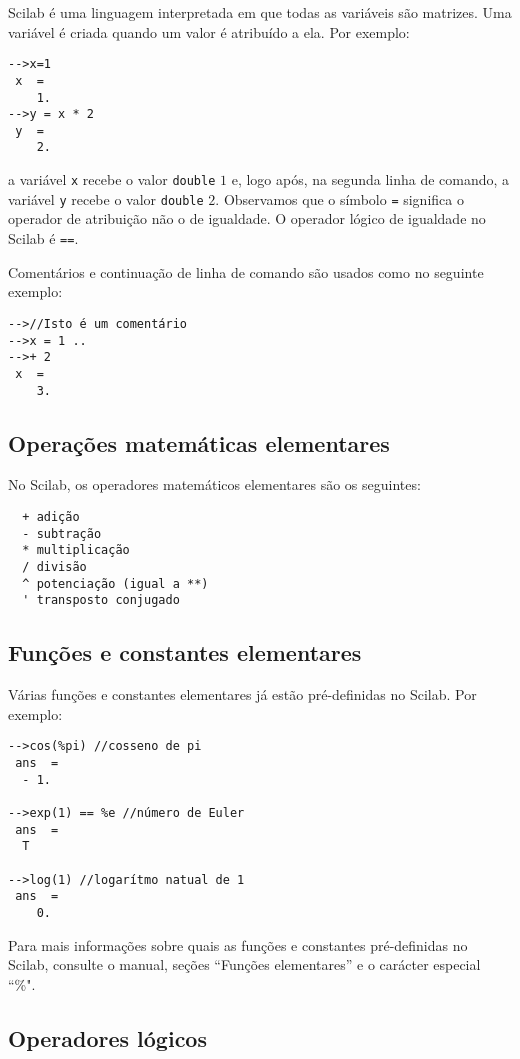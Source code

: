 Scilab é uma linguagem interpretada em que todas as variáveis são matrizes. Uma variável é criada quando um valor é atribuído a ela. Por exemplo:
\begin{verbatim}
-->x=1
 x  =
    1.  
-->y = x * 2
 y  =
    2.  
\end{verbatim}
a variável \verb+x+ recebe o valor \verb+double+ $1$ e, logo após, na segunda linha de comando, a variável \verb+y+ recebe o valor \verb+double+ $2$. Observamos que o símbolo \verb+=+ significa o operador de atribuição não o de igualdade. O operador lógico de igualdade no Scilab é \verb+==+.

Comentários e continuação de linha de comando são usados como no seguinte exemplo:
\begin{verbatim}
-->//Isto é um comentário
-->x = 1 ..
-->+ 2
 x  =
    3.  
\end{verbatim}

\subsection{Operações matemáticas elementares}

No Scilab, os operadores matemáticos elementares são os seguintes:
\begin{verbatim}
  + adição
  - subtração
  * multiplicação
  / divisão
  ^ potenciação (igual a **)
  ' transposto conjugado
\end{verbatim}

\subsection{Funções e constantes elementares}

Várias funções e constantes elementares já estão pré-definidas no Scilab. Por exemplo:
\begin{verbatim}
-->cos(%pi) //cosseno de pi
 ans  =
  - 1.  
 
-->exp(1) == %e //número de Euler
 ans  =
  T  
 
-->log(1) //logarítmo natual de 1
 ans  =
    0.  
\end{verbatim}
Para mais informações sobre quais as funções e constantes pré-definidas no Scilab, consulte o manual, seções ``Funções elementares'' e o carácter especial ``\%".

\subsection{Operadores lógicos}

